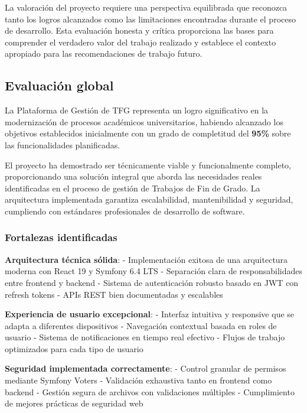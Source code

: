 \documentclass[12pt,a4paper,oneside]{report}
\begin{document}
La valoración del proyecto requiere una perspectiva equilibrada que
reconozca tanto los logros alcanzados como las limitaciones encontradas
durante el proceso de desarrollo. Esta evaluación honesta y crítica
proporciona las bases para comprender el verdadero valor del trabajo
realizado y establece el contexto apropiado para las recomendaciones de
trabajo futuro.

\subsection{Evaluación global}\label{evaluaciuxf3n-global}

La Plataforma de Gestión de TFG representa un logro significativo en la
modernización de procesos académicos universitarios, habiendo alcanzado
los objetivos establecidos inicialmente con un grado de completitud del
\textbf{95\%} sobre las funcionalidades planificadas.

El proyecto ha demostrado ser técnicamente viable y funcionalmente
completo, proporcionando una solución integral que aborda las
necesidades reales identificadas en el proceso de gestión de Trabajos de
Fin de Grado. La arquitectura implementada garantiza escalabilidad,
mantenibilidad y seguridad, cumpliendo con estándares profesionales de
desarrollo de software.

\subsubsection{Fortalezas identificadas}\label{fortalezas-identificadas}

\textbf{Arquitectura técnica sólida}: - Implementación exitosa de una
arquitectura moderna con React 19 y Symfony 6.4 LTS - Separación clara
de responsabilidades entre frontend y backend - Sistema de autenticación
robusto basado en JWT con refresh tokens - APIs REST bien documentadas y
escalables

\textbf{Experiencia de usuario excepcional}: - Interfaz intuitiva y
responsive que se adapta a diferentes dispositivos - Navegación
contextual basada en roles de usuario - Sistema de notificaciones en
tiempo real efectivo - Flujos de trabajo optimizados para cada tipo de
usuario

\textbf{Seguridad implementada correctamente}: - Control granular de
permisos mediante Symfony Voters - Validación exhaustiva tanto en
frontend como backend - Gestión segura de archivos con validaciones
múltiples - Cumplimiento de mejores prácticas de seguridad web
\end{document}
